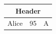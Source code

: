 \begin{tabular}{|l|c|r|}
\hline
\multicolumn{3}{|c|}{Header} \\
\hline
Alice & 95 & A \\
\hline
\end{tabular}